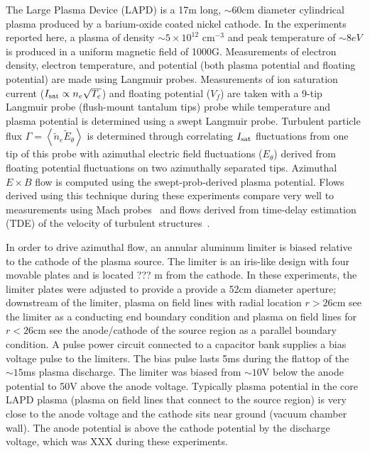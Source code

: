 \documentclass[aps,prl,amsmath,amssymb,preprint,superscriptaddress]{revtex4}
\begin{document}
The Large Plasma Device \cite{gek91} (LAPD) is a 17m long, $\sim 60$cm
diameter cylindrical plasma produced by a barium-oxide coated nickel
cathode. In the experiments reported here, a plasma of density $\sim 5
\times 10^{12}$ cm$^{-3}$ and peak temperature of $\sim 8 eV$ is
produced in a uniform magnetic field of 1000G.  Measurements of 
electron density, electron temperature, and potential (both plasma
potential and floating potential) are made using Langmuir probes.  
Measurements of ion saturation current ($I_{\rm sat} \propto n_e \sqrt{T_e}$) and floating
potential ($V_f$) are taken with a 9-tip Langmuir probe (flush-mount
tantalum tips) probe while temperature and plasma potential is
determined using a swept Langmuir probe. Turbulent particle flux
$\Gamma = \left<\tilde{n}_e \tilde{E}_\theta\right>$ is
determined through correlating $I_{\rm sat}$ fluctuations from one tip
of this probe with
azimuthal electric field fluctuations ($E_\theta$) derived from
floating potential fluctuations on two azimuthally separated tips.
Azimuthal $E\times B$ flow is computed
using the swept-prob-derived plasma potential.  Flows derived using
this technique during these experiments compare very well to measurements using
Mach probes~\cite{maggs2007} and flows derived from time-delay
estimation (TDE) of the velocity of turbulent structures~\cite{}.
 
In order to drive azimuthal flow, an annular aluminum limiter is
biased relative to the cathode of the plasma source.  The limiter is
an iris-like design with four movable plates and is located ??? m from
the cathode.  In these experiments, the limiter plates were adjusted
to provide a provide a 52cm diameter aperture; downstream of the
limiter, plasma on field lines with radial location $r>26$cm see the
limiter as a conducting end boundary condition and plasma on field
lines for $r<26$cm see the anode/cathode of the source region as a
parallel boundary condition.  A pulse power circuit connected to a
capacitor bank supplies a bias voltage pulse to the limiters.  The
bias pulse lasts 5ms during the flattop of the $\sim 15$ms plasma
discharge. The limiter was biased from $\sim 10$V below the anode
potential to 50V above the anode voltage.  Typically plasma potential
in the core LAPD plasma (plasma on field lines that connect to the
source region) is very close to the anode voltage and the cathode sits
near ground (vacuum chamber wall).  The anode potential is above the
cathode potential by the discharge voltage, which was XXX during these experiments.
\end{document}
